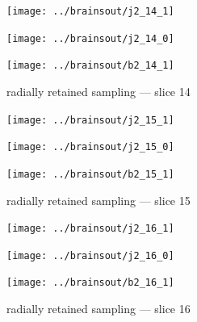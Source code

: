 \documentclass{article}
\begin{document}
\begin{figure}
\begin{centering}

\parbox{\imsize}{\texttt{[image: ../brainsout/j2\_14\_1]}}

\vspace{\vertsep}

\parbox{\imsize}{\texttt{[image: ../brainsout/j2\_14\_0]}}

\vspace{\vertsep}

\parbox{\imsize}{\texttt{[image: ../brainsout/b2\_14\_1]}}

\end{centering}
\caption{radially retained sampling --- slice 14}
\end{figure}


\begin{figure}
\begin{centering}

\parbox{\imsize}{\texttt{[image: ../brainsout/j2\_15\_1]}}

\vspace{\vertsep}

\parbox{\imsize}{\texttt{[image: ../brainsout/j2\_15\_0]}}

\vspace{\vertsep}

\parbox{\imsize}{\texttt{[image: ../brainsout/b2\_15\_1]}}

\end{centering}
\caption{radially retained sampling --- slice 15}
\end{figure}


\begin{figure}
\begin{centering}

\parbox{\imsize}{\texttt{[image: ../brainsout/j2\_16\_1]}}

\vspace{\vertsep}

\parbox{\imsize}{\texttt{[image: ../brainsout/j2\_16\_0]}}

\vspace{\vertsep}

\parbox{\imsize}{\texttt{[image: ../brainsout/b2\_16\_1]}}

\end{centering}
\caption{radially retained sampling --- slice 16}
\end{figure}
\end{document}
